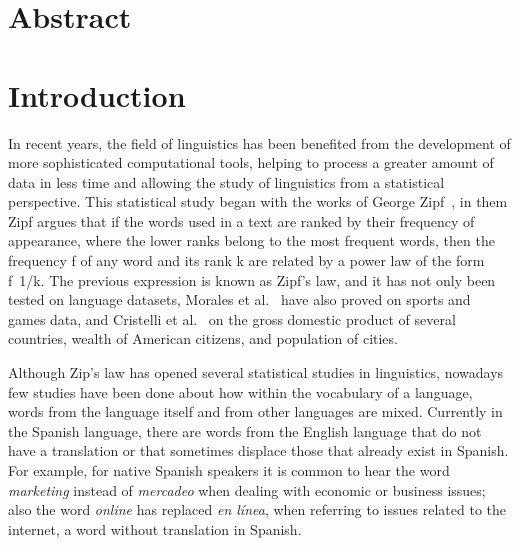 \documentclass[10pt,letterpaper]{article} %
\begin{document}
\section*{Abstract} %



\linenumbers
\section*{Introduction} %

 
In recent years, the field of linguistics has been benefited from the
development of more sophisticated computational tools, helping to process a
greater amount of data in less time and allowing the study of linguistics  from
a statistical perspective.  This statistical study began with the works of
George Zipf~\cite{Zipf}, in them Zipf argues that if  the words used in a text
are ranked by their frequency of appearance,  where the lower ranks belong to
the most frequent words,  then the frequency  f  of any word and its rank  k
are related by a power law of the form f~1/k. The previous expression is known
as  Zipf’s law, and it has not only been tested on language datasets,  Morales
et al.~\cite{Morales_epj} have also proved on sports and games data,  and
Cristelli et al.~\cite{Cristelli_zipfgdp} on the gross domestic product of several
countries,  wealth of American citizens,  and population of cities.
 
Although Zip’s law has opened several statistical studies in linguistics,
nowadays few studies have been done about how within the vocabulary of a
language, words from the language itself and from other languages are
mixed.
Currently in the Spanish language, there are words from the English language
that do not have a translation or that sometimes displace those that already
exist in Spanish.  For example, for native Spanish speakers it is common to
hear the word \textit{marketing} instead of \textit{mercadeo}  when dealing
with economic or
business issues; also the word \textit{online} has replaced \textit{en línea}, when referring to
issues related to the internet, a word without translation in Spanish.
 
\end{document}
